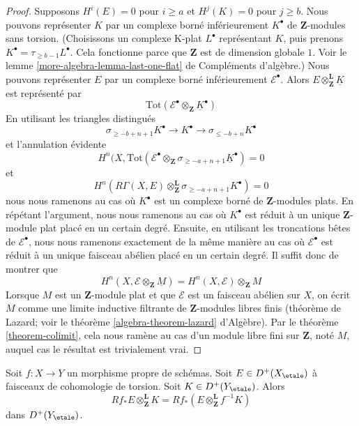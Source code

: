 \begin{proof}
Supposons $H^i(E) = 0$ pour $i \geq a$ et $H^j(K) = 0$ pour $j \geq b$.
Nous pouvons représenter $K$ par un complexe borné inférieurement
$K^\bullet$ de $\mathbf{Z}$-modules sans torsion.
(Choisissons un complexe K-plat $L^\bullet$ représentant $K$, puis
prenons $K^\bullet = \tau_{\geq b - 1}L^\bullet$. Cela fonctionne parce que
$\mathbf{Z}$ est de dimension globale $1$. Voir le
lemme \ref{more-algebra-lemma-last-one-flat} de Compléments d'algèbre.)
Nous pouvons représenter $E$ par un complexe borné inférieurement
$\mathcal{E}^\bullet$.
Alors $E \otimes_\mathbf{Z}^\mathbf{L} \underline{K}$ est
représenté par
$$
\text{Tot}(\mathcal{E}^\bullet \otimes_\mathbf{Z} \underline{K}^\bullet)
$$
En utilisant les triangles distingués
$$
\sigma_{\geq -b + n + 1}K^\bullet
\to K^\bullet \to
\sigma_{\leq -b + n}K^\bullet
$$
et l'annulation évidente
$$
H^n(X,
\text{Tot}(\mathcal{E}^\bullet \otimes_\mathbf{Z}
\sigma_{\geq -a + n + 1}\underline{K}^\bullet) = 0
$$
et
$$
H^n(R\Gamma(X, E)
\otimes_\mathbf{Z}^\mathbf{L} \sigma_{\geq -a + n + 1}K^\bullet) = 0
$$
nous nous ramenons au cas où $K^\bullet$ est un complexe borné de
$\mathbf{Z}$-modules plats. En répétant l'argument, nous nous ramenons au
cas où $K^\bullet$ est réduit à un unique $\mathbf{Z}$-module plat
placé en un certain degré. Ensuite, en utilisant les troncations bêtes
de $\mathcal{E}^\bullet$,
nous nous ramenons exactement de la même manière au cas où
$\mathcal{E}^\bullet$ est réduit à un unique faisceau abélien placé
en un certain degré. Il suffit donc de montrer que
$$
H^n(X, \mathcal{E} \otimes_\mathbf{Z} \underline{M}) =
H^n(X, \mathcal{E}) \otimes_\mathbf{Z} M
$$
Lorsque $M$ est un $\mathbf{Z}$-module plat et que $\mathcal{E}$ est
un faisceau abélien sur $X$,
on écrit $M$ comme une limite inductive filtrante de $\mathbf{Z}$-modules libres finis
(théorème de Lazard; voir le théorème \ref{algebra-theorem-lazard} d'Algèbre).
Par le théorème \ref{theorem-colimit}, cela nous ramène au cas d'un module libre fini
sur $\mathbf{Z}$, noté $M$, auquel cas le résultat est trivialement vrai.
\end{proof}

\begin{lemma}
\label{lemma-projection-formula-proper}
Soit $f : X \to Y$ un morphisme propre de schémas.
Soit $E \in D^+(X_\etale)$ à faisceaux de cohomologie de torsion.
Soit $K \in D^+(Y_\etale)$. Alors
$$
Rf_*E \otimes_\mathbf{Z}^\mathbf{L} K =
Rf_*(E \otimes_\mathbf{Z}^\mathbf{L} f^{-1}K)
$$
dans $D^+(Y_\etale)$.
\end{lemma}

